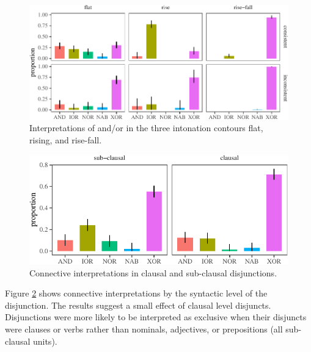 \documentclass[floatsintext,man]{apa6}
\theoremstyle{definition}
\theoremstyle{definition}
\theoremstyle{definition}
\theoremstyle{remark}
\begin{document}
\begin{figure}[tb]

{\centering \includegraphics{figs/consistencyByintonationPlot-1} 

}

\caption{Interpretations of and/or in the three intonation contours flat, rising, and rise-fall.}\label{fig:consistencyByintonationPlot}
\end{figure}

\begin{figure}[tb]

{\centering \includegraphics{figs/syntaxPlot-1} 

}

\caption{Connective interpretations in clausal and sub-clausal disjunctions.}\label{fig:syntaxPlot}
\end{figure}

Figure \ref{fig:syntaxPlot} shows connective interpretations by the
syntactic level of the disjunction. The results suggest a small effect
of clausal level disjuncts. Disjunctions were more likely to be
interpreted as exclusive when their disjuncts were clauses or verbs
rather than nominals, adjectives, or prepositions (all sub-clausal
units).
\end{document}
